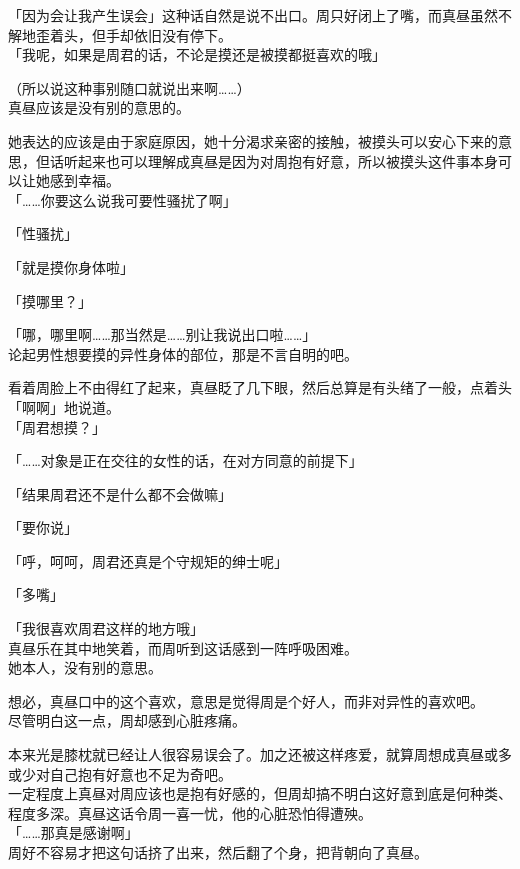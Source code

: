「因为会让我产生误会」这种话自然是说不出口。周只好闭上了嘴，而真昼虽然不解地歪着头，但手却依旧没有停下。\\

「我呢，如果是周君的话，不论是摸还是被摸都挺喜欢的哦」

（所以说这种事别随口就说出来啊……）\\

真昼应该是没有别的意思的。

她表达的应该是由于家庭原因，她十分渴求亲密的接触，被摸头可以安心下来的意思，但话听起来也可以理解成真昼是因为对周抱有好意，所以被摸头这件事本身可以让她感到幸福。\\

「……你要这么说我可要性骚扰了啊」

「性骚扰」

「就是摸你身体啦」

「摸哪里？」

「哪，哪里啊……那当然是……别让我说出口啦……」\\

论起男性想要摸的异性身体的部位，那是不言自明的吧。

看着周脸上不由得红了起来，真昼眨了几下眼，然后总算是有头绪了一般，点着头「啊啊」地说道。\\

「周君想摸？」

「……对象是正在交往的女性的话，在对方同意的前提下」

「结果周君还不是什么都不会做嘛」

「要你说」

「呼，呵呵，周君还真是个守规矩的绅士呢」

「多嘴」

「我很喜欢周君这样的地方哦」\\

真昼乐在其中地笑着，而周听到这话感到一阵呼吸困难。\\

她本人，没有别的意思。

想必，真昼口中的这个喜欢，意思是觉得周是个好人，而非对异性的喜欢吧。\\

尽管明白这一点，周却感到心脏疼痛。

本来光是膝枕就已经让人很容易误会了。加之还被这样疼爱，就算周想成真昼或多或少对自己抱有好意也不足为奇吧。\\

一定程度上真昼对周应该也是抱有好感的，但周却搞不明白这好意到底是何种类、程度多深。真昼这话令周一喜一忧，他的心脏恐怕得遭殃。\\

「……那真是感谢啊」\\

周好不容易才把这句话挤了出来，然后翻了个身，把背朝向了真昼。
